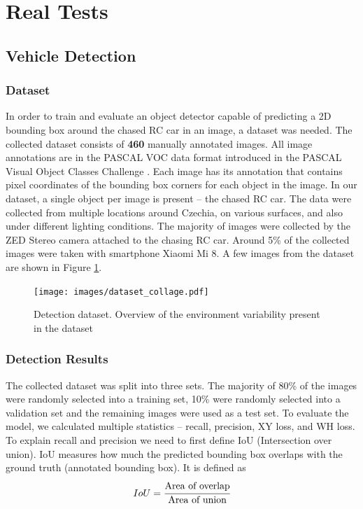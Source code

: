\documentclass{ctuthesis/ctuthesis}
\begin{document}
\section{Real Tests}
\subsection{Vehicle Detection}
\subsubsection{Dataset} \label{s:detection_dataset}
In order to train and evaluate an object detector capable of predicting a 2D bounding box around the chased RC car in an image, a dataset was needed. The collected dataset \cite{my_github} consists of \textbf{460} manually annotated images. All image annotations are in the PASCAL VOC data format introduced in the PASCAL Visual Object Classes Challenge \cite{pascal-voc}. Each image has its annotation that contains pixel coordinates of the bounding box corners for each object in the image. In our dataset, a single object per image is present -- the chased RC car. The data were collected from multiple locations around Czechia, on various surfaces, and also under different lighting conditions. The majority of images were collected by the ZED Stereo camera attached to the chasing RC car. Around 5\% of the collected images were taken with smartphone Xiaomi Mi 8. A few images from the dataset are shown in Figure \ref{f:dataset_detection}.

\begin{figure}[]
    \centering
    \texttt{[image: images/dataset\_collage.pdf]}
    
    \caption{Detection dataset. Overview of the environment variability present in the dataset}\label{f:dataset_detection}
\end{figure}


\subsubsection{Detection Results}
The collected dataset was split into three sets. The majority of 80\% of the images were randomly selected into a training set, 10\% were randomly selected into a validation set and the remaining images were used as a test set. To evaluate the model, we calculated multiple statistics -- recall, precision, XY loss, and WH loss. To explain recall and precision we need to first define IoU (Intersection over union). IoU measures how much the predicted bounding box overlaps with the ground truth (annotated bounding box). It is defined as 
\begin{equation}IoU = \cfrac{\textrm{Area of overlap}}{\textrm{Area of union}}\end{equation}
\end{document}
